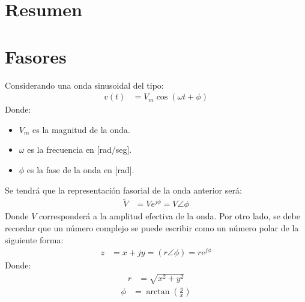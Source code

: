 \documentclass[
  11pt,
  letterpaper,
   addpoints,
   answers
  ]{exam}
\begin{document}
\section{Resumen}

\section*{Fasores}

Considerando una onda sinusoidal del tipo:
\begin{align}
v(t) &= V_m \cos(\omega t + \phi)
\end{align}
Donde:
\begin{itemize}
    \item $V_m$ es la magnitud de la onda.
    \item $\omega$ es la frecuencia en [rad/seg].
    \item $\phi$ es la fase de la onda en [rad].
\end{itemize}
Se tendrá que la representación fasorial de la onda anterior será:
\begin{align}
\tilde{V} &= V e^{j\phi} = V \angle \phi
\end{align}
Donde $V$ corresponderá a la amplitud efectiva de la onda. Por otro lado, se debe recordar que un número complejo se puede escribir como un número polar de la siguiente forma:
\begin{align}
z &= x + jy = (r \angle \phi) = r e^{j\phi}
\end{align}
Donde:
\begin{align}
r &= \sqrt{x^2 + y^2}
\end{align}
\begin{align}
\phi &= \arctan\left(\frac{y}{x}\right)
\end{align}
\end{document}
